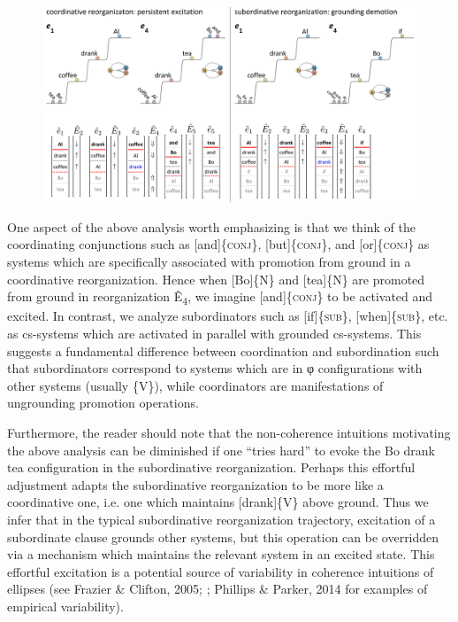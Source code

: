   
\begin{figure}
\includegraphics[width=\textwidth]{figures/Tilsen-img146.png}
\caption{\missingcaption}
\label{fig:}
\end{figure}
 

  One aspect of the above analysis worth emphasizing is that we think of the coordinating conjunctions such as [and]\{\textsc{conj}\}, [but]\{\textsc{conj}\}, and [or]\{\textsc{conj}\} as systems which are specifically associated with promotion from ground in a coordinative reorganization. Hence when [Bo]\{N\} and [tea]\{N\} are promoted from ground in reorganization Ê\textsubscript{4}, we imagine [and]\{\textsc{conj}\} to be activated and excited. In contrast, we analyze subordinators such as [if]\{\textsc{sub}\}, [when]\{\textsc{sub}\}, etc. as cs-systems which are activated in parallel with grounded cs-systems. This suggests a fundamental difference between coordination and subordination such that subordinators correspond to systems which are in φ configurations with other systems (usually \{V\}), while coordinators are manifestations of ungrounding promotion operations.

  Furthermore, the reader should note that the non-coherence intuitions motivating the above analysis can be diminished if one “tries hard” to evoke the {\textbar}Bo drank tea{\textbar} configuration in the subordinative reorganization. Perhaps this effortful adjustment adapts the subordinative reorganization to be more like a coordinative one, i.e. one which maintains [drank]\{V\} above ground. Thus we infer that in the typical subordinative reorganization trajectory, excitation of a subordinate clause grounds other systems, but this operation can be overridden via a mechanism which maintains the relevant system in an excited state. This effortful excitation is a potential source of variability in coherence intuitions of ellipses (see Frazier \& Clifton, 2005; \citealt{Phillips2003}; Phillips \& Parker, 2014 for examples of empirical variability). 

